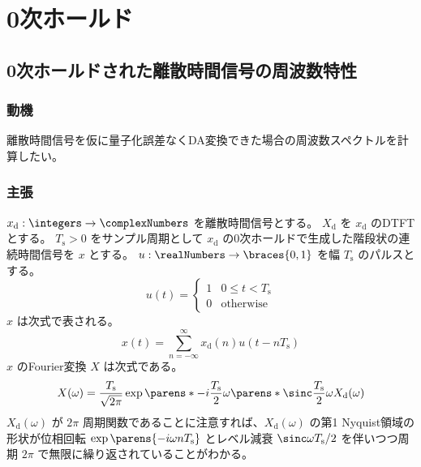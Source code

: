 \chapter{0次ホールド}
    \providecommand{\FT}[1]{\mathcal{F}\parens*{#1}}
    \providecommand{\Ts}{T_\text{s}}
    \section{0次ホールドされた離散時間信号の周波数特性}
        \newcommand{\xd}{x_\text{d}}
        \newcommand{\Xd}{X_\text{d}}
        \subsection{動機}
            離散時間信号を仮に量子化誤差なくDA変換できた場合の周波数スペクトルを計算したい。
        \subsection{主張}
            $\xd:\integers\to\complexNumbers$ を離散時間信号とする。
            $\Xd$ を $\xd$ のDTFTとする。
            $\Ts>0$ をサンプル周期として $\xd$ の0次ホールドで生成した階段状の連続時間信号を $x$ とする。
            $u:\realNumbers\to\braces{0,1}$ を幅 $\Ts$ のパルスとする。
            \[
                u(t) = \begin{cases}
                    1 & 0\leq t < \Ts \\
                    0 & \text{otherwise}
                \end{cases}
            \]
            $x$ は次式で表される。
            \[ x(t) = \sum_{n=-\infty}^\infty \xd(n)u(t-n\Ts) \]
            $x$ のFourier変換 $X$ は次式である。
            \[ X(\omega) = \frac{\Ts}{\sqrt{2\pi}}\exp\parens*{-i\frac{\Ts}{2}\omega}\parens*{\sinc \frac{\Ts}{2}\omega}\Xd(\omega) \]
            $\Xd(\omega)$ が $2\pi$ 周期関数であることに注意すれば、$\Xd(\omega)$ の第1 Nyquist領域の形状が位相回転 $\exp\parens{-i \omega n\Ts}$ とレベル減衰 $\sinc\omega\Ts/2$ を伴いつつ周期 $2\pi$ で無限に繰り返されていることがわかる。

